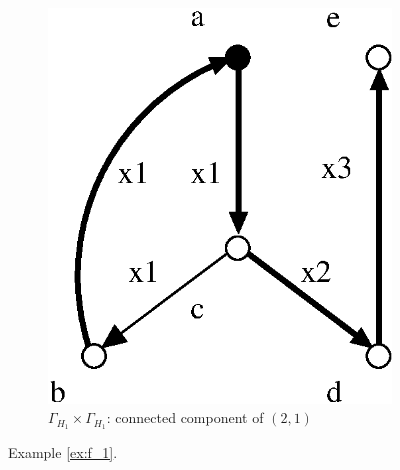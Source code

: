 \documentclass[a4paper,12pt]{article}
\newcommand{\G}{\Gamma }
\numberwithin{equation}{section}
\numberwithin{figure}{section}
\begin{document}
\begin{figure}
\begin{center}
\begin{subfigure}[b]{.25\columnwidth}
\includegraphics[scale=.52]{GxG-2.eps}
\caption{$\G_{H_1}\times \G_{H_1}$: connected component of $(2,1)$}
\label{fig:GxG-2}
\end{subfigure}
\end{center}
\caption{Example \ref{ex:f_1}.}\label{fig:stall}
\end{figure}
\end{document}
